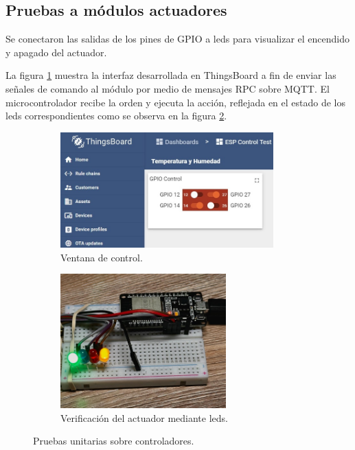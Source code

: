 \subsection{Pruebas a módulos actuadores}
\label{sec:Pruebas a módulos actuadores}

Se conectaron las salidas de los pines de GPIO a leds para visualizar el encendido y apagado del actuador. 

La figura \ref{fig:control_test1} muestra la interfaz desarrollada en ThingsBoard a fin de enviar las señales de comando al módulo por medio de mensajes RPC sobre MQTT. El microcontrolador recibe la orden y ejecuta la acción, reflejada en el estado de los leds correspondientes como se observa en la figura \ref{fig:control_test2}.



\begin{figure}[htpb]
     \centering
       \begin{subfigure}[b]{0.50\textwidth}
	    \centering
		 \includegraphics[width=0.9\textwidth]{./Figures/chapter4/control_unit_test_1.jpg}
		\caption{Ventana de control.}
		\label{fig:control_test1}
     \end{subfigure}
          \hfill
     \begin{subfigure}[b]{0.45\textwidth}
		\centering
		\includegraphics[width=0.70\textwidth]{./Figures/chapter4/control_test2.jpg}
		\caption{Verificación del actuador mediante leds.}
		\label{fig:control_test2}
     \end{subfigure}
     \hfill
        \caption[Pruebas unitarias sobre controladores]{Pruebas unitarias sobre controladores.}
        \label{fig:control_test}
\end{figure}


